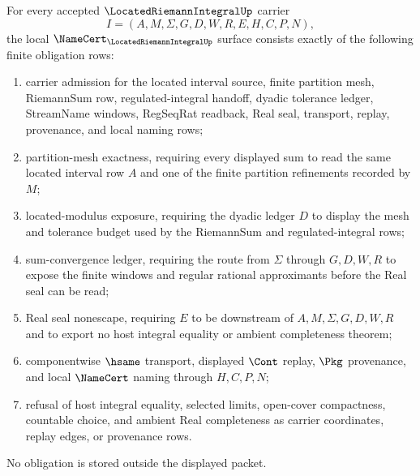 \begin{theorem}
\label{thm:located-riemann-integral-namecert-obligations}
For every accepted $\LocatedRiemannIntegralUp$ carrier
$$
I=(A,M,\Sigma,G,D,W,R,E,H,C,P,N),
$$
the local $\NameCert_{\LocatedRiemannIntegralUp}$ surface consists exactly of the following finite obligation rows:
\begin{enumerate}
\item carrier admission for the located interval source, finite partition mesh, RiemannSum row, regulated-integral handoff, dyadic tolerance ledger, StreamName windows, RegSeqRat readback, Real seal, transport, replay, provenance, and local naming rows;
\item partition-mesh exactness, requiring every displayed sum to read the same located interval row $A$ and one of the finite partition refinements recorded by $M$;
\item located-modulus exposure, requiring the dyadic ledger $D$ to display the mesh and tolerance budget used by the RiemannSum and regulated-integral rows;
\item sum-convergence ledger, requiring the route from $\Sigma$ through $G,D,W,R$ to expose the finite windows and regular rational approximants before the Real seal can be read;
\item Real seal nonescape, requiring $E$ to be downstream of $A,M,\Sigma,G,D,W,R$ and to export no host integral equality or ambient completeness theorem;
\item componentwise $\hsame$ transport, displayed $\Cont$ replay, $\Pkg$ provenance, and local $\NameCert$ naming through $H,C,P,N$;
\item refusal of host integral equality, selected limits, open-cover compactness, countable choice, and ambient Real completeness as carrier coordinates, replay edges, or provenance rows.
\end{enumerate}
No obligation is stored outside the displayed packet.
\end{theorem}
